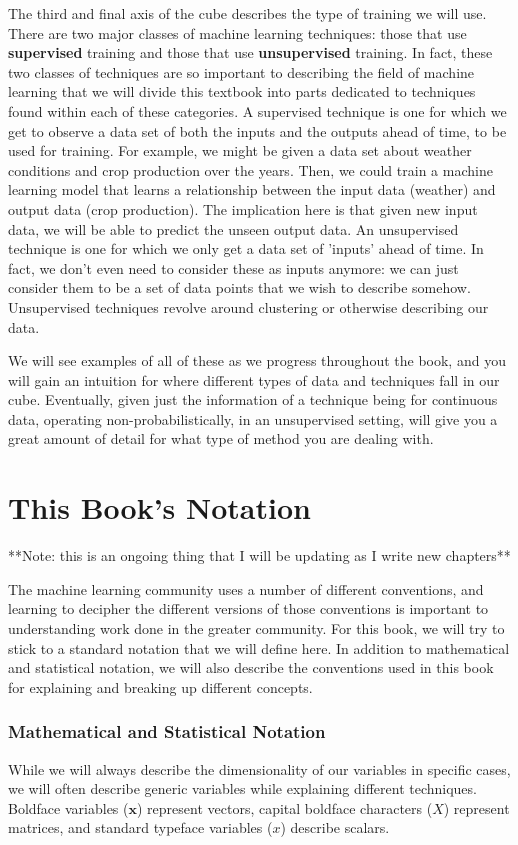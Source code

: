 The third and final axis of the cube describes the type of training we will use. There are two major classes of machine learning techniques: those that use \textbf{supervised} training and those that use \textbf{unsupervised} training. In fact, these two classes of techniques are so important to describing the field of machine learning that we will divide this textbook into parts dedicated to techniques found within each of these categories. A supervised technique is one for which we get to observe a data set of both the inputs and the outputs ahead of time, to be used for training. For example, we might be given a data set about weather conditions and crop production over the years. Then, we could train a machine learning model that learns a relationship between the input data (weather) and output data (crop production). The implication here is that given new input data, we will be able to predict the unseen output data. An unsupervised technique is one for which we only get a data set of 'inputs' ahead of time. In fact, we don't even need to consider these as inputs anymore: we can just consider them to be a set of data points that we wish to describe somehow. Unsupervised techniques revolve around clustering or otherwise describing our data.

We will see examples of all of these as we progress throughout the book, and you will gain an intuition for where different types of data and techniques fall in our cube. Eventually, given just the information of a technique being for continuous data, operating non-probabilistically, in an unsupervised setting, will give you a great amount of detail for what type of method you are dealing with.

\section{This Book's Notation}
**Note: this is an ongoing thing that I will be updating as I write new chapters**

The machine learning community uses a number of different conventions, and learning to decipher the different versions of those conventions is important to understanding work done in the greater community. For this book, we will try to stick to a standard notation that we will define here. In addition to mathematical and statistical notation, we will also describe the conventions used in this book for explaining and breaking up different concepts.

\subsubsection{Mathematical and Statistical Notation}
While we will always describe the dimensionality of our variables in specific cases, we will often describe generic variables while explaining different techniques. Boldface variables ($\textbf{x}$) represent vectors, capital boldface characters ($X$) represent matrices, and standard typeface variables ($x$) describe scalars.

